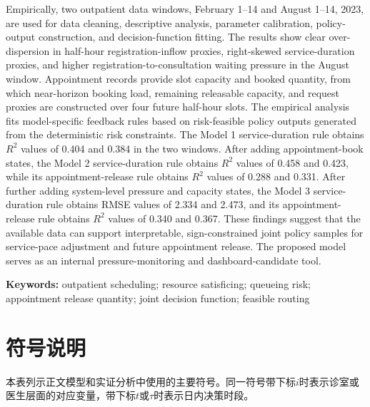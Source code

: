 \documentclass[a4paper,zihao=-4]{ctexart}
\numberwithin{figure}{section}
\numberwithin{table}{section}
\begin{document}
\noindent Empirically, two outpatient data windows, February 1--14 and August 1--14, 2023, are used for data cleaning, descriptive analysis, parameter calibration, policy-output construction, and decision-function fitting. The results show clear over-dispersion in half-hour registration-inflow proxies, right-skewed service-duration proxies, and higher registration-to-consultation waiting pressure in the August window. Appointment records provide slot capacity and booked quantity, from which near-horizon booking load, remaining releasable capacity, and request proxies are constructed over four future half-hour slots. The empirical analysis fits model-specific feedback rules based on risk-feasible policy outputs generated from the deterministic risk constraints. The Model 1 service-duration rule obtains $R^2$ values of 0.404 and 0.384 in the two windows. After adding appointment-book states, the Model 2 service-duration rule obtains $R^2$ values of 0.458 and 0.423, while its appointment-release rule obtains $R^2$ values of 0.288 and 0.331. After further adding system-level pressure and capacity states, the Model 3 service-duration rule obtains RMSE values of 2.334 and 2.473, and its appointment-release rule obtains $R^2$ values of 0.340 and 0.367. These findings suggest that the available data can support interpretable, sign-constrained joint policy samples for service-pace adjustment and future appointment release. The proposed model serves as an internal pressure-monitoring and dashboard-candidate tool.

\noindent\textbf{Keywords:} outpatient scheduling; resource satisficing; queueing risk; appointment release quantity; joint decision function; feasible routing

\clearpage

\section*{符号说明}

本表列示正文模型和实证分析中使用的主要符号。同一符号带下标$i$时表示诊室或医生层面的对应变量，带下标$t$或$\tau$时表示日内决策时段。
\end{document}
